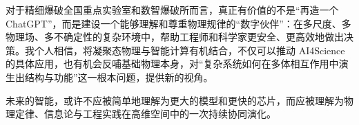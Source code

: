 \documentclass[12pt,a4paper]{article}
\begin{document}
对于精细爆破全国重点实验室和数智爆破所而言，真正有价值的不是“再造一个 ChatGPT”，而是建设一个能够理解和尊重物理规律的“数字伙伴”：在多尺度、多物理场、多不确定性的复杂环境中，帮助工程师和科学家更安全、更高效地做出决策。我个人相信，将凝聚态物理与智能计算有机结合，不仅可以推动 AI4Science 的具体应用，也有机会反哺基础物理本身，对“复杂系统如何在多体相互作用中演生出结构与功能”这一根本问题，提供新的视角。

未来的智能，或许不应被简单地理解为更大的模型和更快的芯片，而应被理解为物理定律、信息论与工程实践在高维空间中的一次持续协同演化。

\newpage


 
\end{document}
